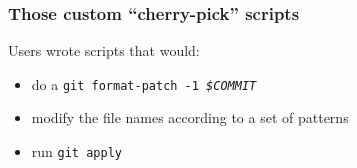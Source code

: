 \documentclass[compress,t]{beamer}
\begin{document}

\begin{frame}
  \frametitle{Those custom ``cherry-pick'' scripts}

  Users wrote scripts that would:

  \begin{itemize}[<+(1)->]
    \item do a \texttt{git format-patch -1 \textit{\$COMMIT}}
    \item modify the file names according to a set of patterns
    \item run \texttt{git apply}
  \end{itemize}


\end{frame}

\end{document}
